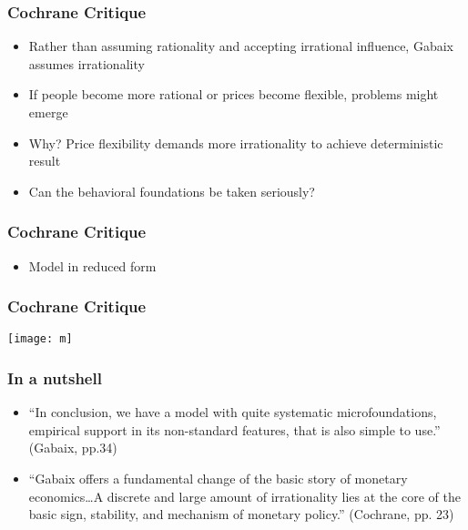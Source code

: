 \documentclass{beamer}
\begin{document}

\begin{frame}
\frametitle{Cochrane Critique}
\begin{itemize}
\item Rather than assuming rationality and accepting irrational influence, Gabaix assumes irrationality 
\item If people become more rational or prices become flexible, problems might emerge
\item Why? Price flexibility demands more irrationality to achieve deterministic result
\item Can the behavioral foundations be taken seriously?
\end{itemize}
\end{frame}


\begin{frame}
\frametitle{Cochrane Critique}
\begin{itemize}
\item Model in reduced form
\end{itemize}
\end{frame}


\begin{frame}

\frametitle{Cochrane Critique}
\texttt{[image: m]}

\end{frame}


\begin{frame}
\frametitle{In a nutshell}
\begin{itemize}
\item “In conclusion, we have a model with quite systematic microfoundations, empirical support in its non-standard features, that is also simple to use.” (Gabaix, pp.34) 
\item “Gabaix offers a fundamental change of the basic story of monetary economics…A discrete and large amount of irrationality lies at the core of the basic sign, stability, and mechanism of monetary policy.” (Cochrane, pp. 23)
\end{itemize}
\end{frame}
\end{document}
